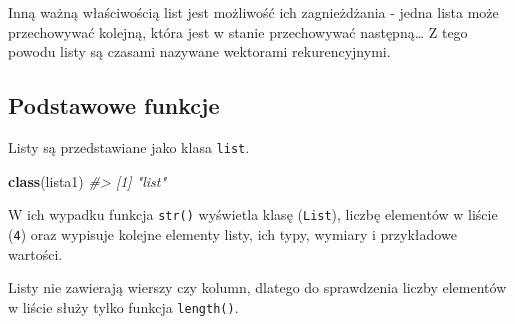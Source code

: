 \documentclass[paper=6in:9in,pagesize=pdftex,headinclude=on,footinclude=on,10pt]{scrbook}
\newenvironment{Shaded}{\begin{snugshade}}{\end{snugshade}}
\newcommand{\CommentTok}[1]{\textcolor[rgb]{0.56,0.35,0.01}{\textit{#1}}}
\newcommand{\KeywordTok}[1]{\textcolor[rgb]{0.13,0.29,0.53}{\textbf{#1}}}
\newcommand{\NormalTok}[1]{#1}
\newcommand{\StringTok}[1]{\textcolor[rgb]{0.31,0.60,0.02}{#1}}
\begin{document}
Inną ważną właściwością list jest możliwość ich zagnieżdżania - jedna lista może przechowywać kolejną, która jest w stanie przechowywać następną\ldots{} Z tego powodu listy są czasami nazywane wektorami rekurencyjnymi.

\begin{Shaded}
\end{Shaded}

\hypertarget{podstawowe-funkcje-2}{%
\subsection{Podstawowe funkcje}\label{podstawowe-funkcje-2}}

Listy są przedstawiane jako klasa \texttt{list}.

\begin{Shaded}
\begin{Highlighting}[]
\KeywordTok{class}\NormalTok{(lista1)}
\CommentTok{#> [1] "list"}
\end{Highlighting}
\end{Shaded}

W ich wypadku funkcja \texttt{str()} wyświetla klasę (\texttt{List}), liczbę elementów w liście (\texttt{4}) oraz wypisuje kolejne elementy listy, ich typy, wymiary i przykładowe wartości.

\begin{Shaded}
\end{Shaded}

Listy nie zawierają wierszy czy kolumn, dlatego do sprawdzenia liczby elementów w liście służy tylko funkcja \texttt{length()}.
\end{document}
